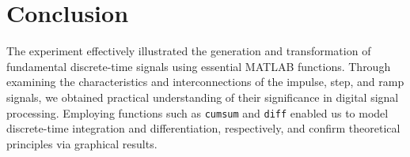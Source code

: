 \documentclass[12pt]{article}
\begin{document}
\section*{Conclusion}
The experiment effectively illustrated the generation and transformation of fundamental discrete-time signals using essential MATLAB functions. Through examining the characteristics and interconnections of the impulse, step, and ramp signals, we obtained practical understanding of their significance in digital signal processing. Employing functions such as \texttt{cumsum} and \texttt{diff} enabled us to model discrete-time integration and differentiation, respectively, and confirm theoretical principles via graphical results.


\renewcommand{\bibname}{References}

\end{document}
